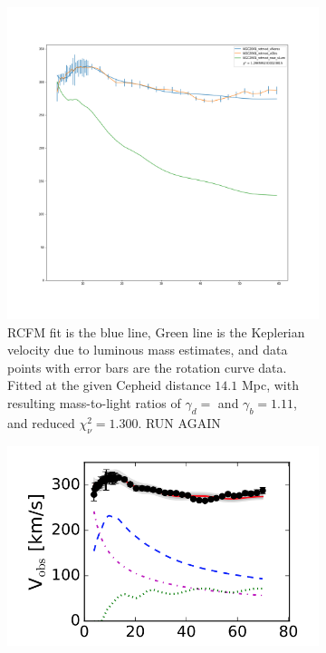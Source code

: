 \documentclass[reprint,%
 amsmath,amssymb,
 aps,
]{revtex4-1}
\begin{document}
 \begin{figure}[ht] 
  \begin{subfigure}[b]{0.5\linewidth}
    \centering
    \includegraphics[width=0.95\linewidth]{figures/NGC2841_rotmod_XueSofue.png} 
    \caption{  RCFM fit is the blue line,  Green line is the Keplerian velocity due to  luminous mass estimates, and data points with error bars are the rotation curve data.
  Fitted at the 
    given Cepheid distance $14.1$ Mpc, with resulting mass-to-light ratios of  $\gamma_d = $    and $\gamma_b =1.11$, and  reduced  $\chi^2_\nu = 1.300$.  RUN AGAIN} 
    \label{fig:ngc2841RCFMfit} 
    \vspace{4ex}
  \end{subfigure}%
  \begin{subfigure}[b]{0.5\linewidth}
    \centering
    \includegraphics[width=0.95\linewidth]{figures/NGC2841_RarResults_Li2018}

\end{subfigure}
\end{figure}
\end{document}
